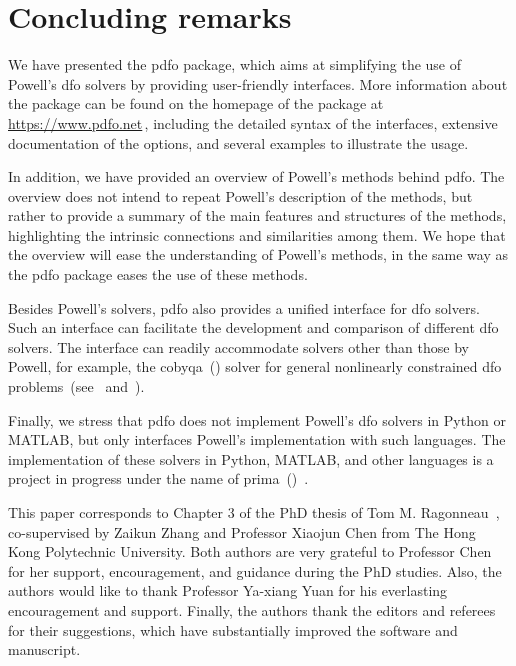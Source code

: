 \documentclass[smallextended]{svjour3}
\newcommand{\modified}[1]{#1}
\begin{document}
\section{Concluding remarks}
\label{sec:conclude}

We have presented the \gls{pdfo} package, which aims at simplifying the use of Powell's \gls{dfo} solvers by providing user-friendly interfaces.
More information about the package can be found on the homepage of the package at \url{https://www.pdfo.net}\,, including the detailed syntax of the interfaces, extensive documentation of the options, and several examples to illustrate the usage.

In addition, we have provided an overview of Powell's methods behind \gls{pdfo}.
The overview does not intend to repeat Powell's description of the methods, but rather to provide a summary of the main features and structures of the methods, highlighting the intrinsic connections and similarities among them.
We hope that the overview will ease the understanding of Powell's methods, in the same way as the \gls{pdfo} package eases the use of these methods.

Besides Powell's solvers, \gls{pdfo} also provides a unified interface for \gls{dfo} solvers.
Such an interface can facilitate the development and comparison of different \gls{dfo} solvers.
The interface can readily accommodate solvers other than those by Powell, for example, the \gls{cobyqa}~() solver for general nonlinearly constrained \gls{dfo} problems~(see~\cite[Chapters~5--7]{Ragonneau_2022} and~\cite{Ragonneau_Zhang_cobyqa}).

Finally, we stress that \gls{pdfo} does not implement Powell's \gls{dfo} solvers in Python or MATLAB, but only interfaces Powell's implementation with such languages.
The implementation of these solvers in Python, MATLAB, and other languages is a project in progress under the name of \gls{prima}~()~\cite{Zhang_prima}.

\modified{
    \begin{acknowledgements}
        This paper corresponds to Chapter 3 of the PhD thesis of Tom M. Ragonneau~\cite{Ragonneau_2022}, co-supervised by Zaikun Zhang and Professor Xiaojun Chen from The Hong Kong Polytechnic University.
        Both authors are very grateful to Professor Chen for her support, encouragement, and guidance during the PhD studies.
        Also, the authors would like to thank Professor Ya-xiang Yuan for his everlasting encouragement and support.
        Finally, the authors thank the editors and referees for their suggestions, which have substantially improved the software and manuscript.
    \end{acknowledgements}
}
\end{document}

